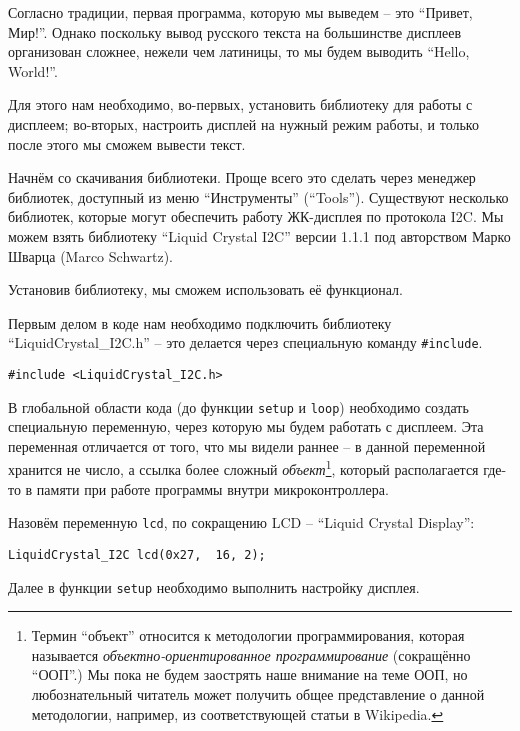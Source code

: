 \documentclass[../sparc.tex]{subfiles}
\begin{document}

Согласно традиции, первая программа, которую мы выведем -- это ``Привет, Мир!''.
Однако поскольку вывод русского текста на большинстве дисплеев организован
сложнее, нежели чем латиницы, то мы будем выводить ``Hello, World!''.

Для этого нам необходимо, во-первых, установить библиотеку для работы с
дисплеем; во-вторых, настроить дисплей на нужный режим работы, и только после
этого мы сможем вывести текст.

Начнём со скачивания библиотеки.  Проще всего это сделать через менеджер
библиотек, доступный из меню ``Инструменты'' (``Tools'').  Существуют несколько
библиотек, которые могут обеспечить работу ЖК-дисплея по протокола I2C.  Мы
можем взять библиотеку ``Liquid Crystal I2C'' версии 1.1.1 под авторством Марко
Шварца (Marco Schwartz).

Установив библиотеку, мы сможем использовать её функционал.

Первым делом в коде нам необходимо подключить библиотеку
``LiquidCrystal\_I2C.h'' -- это делается через специальную команду
\texttt{\#include}.

\begin{verbatim}
#include <LiquidCrystal_I2C.h>
\end{verbatim}

В глобальной области кода (до функции \texttt{setup} и \texttt{loop}) необходимо
создать специальную переменную, через которую мы будем работать с дисплеем. Эта
переменная отличается от того, что мы видели раннее -- в данной переменной
хранится не число, а ссылка более сложный \emph{объект}\footnote{Термин
``объект'' относится к методологии программирования, которая называется
\emph{объектно-ориентированное программирование} (сокращённо ``ООП''.)  Мы пока
не будем заострять наше внимание на теме ООП, но любознательный читатель может
получить общее представление о данной методологии, например, из соответствующей
статьи в Wikipedia.}, который располагается где-то в памяти при работе программы
внутри микроконтроллера.

Назовём переменную \texttt{lcd}, по сокращению \gls{LCD} -- ``Liquid Crystal
Display'':

\begin{verbatim}
LiquidCrystal_I2C lcd(0x27,  16, 2);
\end{verbatim}

Далее в функции \texttt{setup} необходимо выполнить настройку дисплея.
\end{document}
